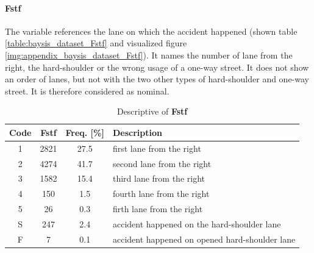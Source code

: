 \paragraph{Fstf}
\label{baysis_dataset_Fstf}
The variable references the lane on which the accident happened (shown table \autoref{table:baysis_dataset_Fstf} and visualized figure \autoref{img:appendix_baysis_dataset_Fstf}). It names the number of lane from the right, the hard-shoulder or the wrong usage of a one-way street. It does not show an order of lanes, but not with the two other types of hard-shoulder and one-way street. It is therefore considered as nominal.
\begin{table}[ht]
	\centering
	\small
	\begin{tabular}{c|c|c|l}
		\toprule
		Code & \textbf{Fstf} & Freq. [\%] & Description \\ 
		\midrule  
		1 & 2821 	& 27.5 	& first lane from the right \\
		2 & 4274 	& 41.7 	& second lane from the right \\
		3 & 1582 	& 15.4 	& third lane from the right \\
		4 & 150 	& 1.5 	& fourth lane from the right \\
		5 & 26 		& 0.3 	& firth lane from the right \\ 
 		S & 247 	& 2.4 	& accident happened on the hard-shoulder lane \\ 
		F & 7 		& 0.1 	& accident happened on opened hard-shoulder lane \\
		\bottomrule
	\end{tabular}
	\caption{Descriptive of \textbf{Fstf}}
	\label{table:baysis_dataset_Fstf}
	\vspace{-8mm}
\end{table}
    
